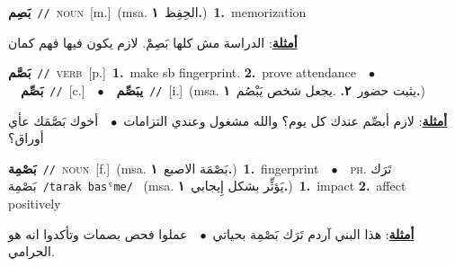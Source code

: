 \documentclass[10pt,a4paper,twoside]{article} %
\begin{document}
\begin{multicols}{2}
{\setlength\topsep{0pt}\textbf{\foreignlanguage{arabic}{بَصِم}}\ {\color{gray}\texttt{//}\color{black}}\ \textsc{noun}\ [m.]\ \color{gray}(msa. \foreignlanguage{arabic}{الحِفِظ}~\foreignlanguage{arabic}{\textbf{١.}})\color{black}\ \textbf{1.}~memorization\  \begin{flushright}\color{gray}\foreignlanguage{arabic}{\textbf{\underline{\foreignlanguage{arabic}{أمثلة}}}: الدراسة مش كلها بَصِمْ. لازم يكون فيها فهم كمان}\end{flushright}\color{black}} \vspace{2mm}

{\setlength\topsep{0pt}\textbf{\foreignlanguage{arabic}{بَصَّم}}\ {\color{gray}\texttt{//}\color{black}}\ \textsc{verb}\ [p.]\ \textbf{1.}~make sb fingerprint.  \textbf{2.}~prove attendance\ \ $\bullet$\ \ \setlength\topsep{0pt}\textbf{\foreignlanguage{arabic}{بَصِّم}}\ {\color{gray}\texttt{//}\color{black}}\ [c.]\ \ $\bullet$\ \ \setlength\topsep{0pt}\textbf{\foreignlanguage{arabic}{يبَصِّم}}\ {\color{gray}\texttt{//}\color{black}}\ [i.]\ \color{gray}(msa. \foreignlanguage{arabic}{يثبت حضور}~\foreignlanguage{arabic}{\textbf{٢.}}  .\foreignlanguage{arabic}{يجعل شخص يَبْصُم}~\foreignlanguage{arabic}{\textbf{١.}})\color{black}\  \begin{flushright}\color{gray}\foreignlanguage{arabic}{\textbf{\underline{\foreignlanguage{arabic}{أمثلة}}}: لازم أبصِّم عندك كل يوم؟ والله مشغول وعندي التزامات\ $\bullet$\ \  أخوك بَصَّمَك عأي أوراق؟}\end{flushright}\color{black}} \vspace{2mm}

{\setlength\topsep{0pt}\textbf{\foreignlanguage{arabic}{بَصْمِة}}\ {\color{gray}\texttt{//}\color{black}}\ \textsc{noun}\ [f.]\ \color{gray}(msa. \foreignlanguage{arabic}{بَصْمَة الاصبع}~\foreignlanguage{arabic}{\textbf{١.}})\color{black}\ \textbf{1.}~fingerprint\ \ $\bullet$\ \ \textsc{ph.} \color{gray} \foreignlanguage{arabic}{تَرَك بَصْمِة}\color{black}\ {\color{gray}\texttt{/{\sffamily tarak basˤme}/}\color{black}}\ \color{gray} (msa. \foreignlanguage{arabic}{يَؤثِّر بشكل إِيجابي}~\foreignlanguage{arabic}{\textbf{١.}})\color{black}\ \textbf{1.}~impact  \textbf{2.}~affect positively\  \begin{flushright}\color{gray}\foreignlanguage{arabic}{\textbf{\underline{\foreignlanguage{arabic}{أمثلة}}}: هذا البني آردم تَرَك بَصْمِة بحياتي\ $\bullet$\ \  عملوا فحص بصمات وتأكدوا انه هو الحرامي.}\end{flushright}\color{black}} \vspace{2mm}


\end{multicols}
\end{document}
